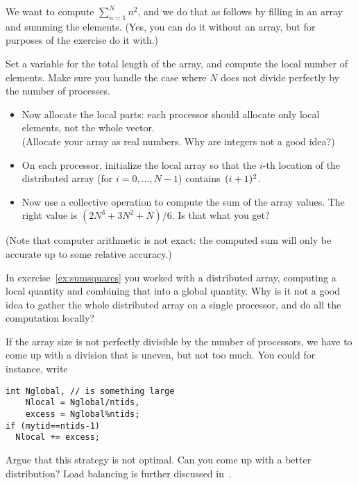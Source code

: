 \begin{exercise}
  \label{ex:sumsquares}
  We want to compute $\sum_{n=1}^Nn^2$, and we do that as follows
  by filling in an array and summing the elements. (Yes, you can do it
  without an array, but for purposes of the exercise do it with.)

  Set a variable  for the total length of the array, and compute
  the local number of elements. Make sure you handle the case where
  $N$ does not divide perfectly by the number of processes.

  \begin{itemize}
  \item Now allocate the local parts: each processor should allocate
    only local elements, not the whole vector.\\
    (Allocate your array as real numbers. Why are integers not a good idea?)
  \item On each processor, initialize the local array
    so that the $i$-th location of the distributed array
    (for $i=0,\ldots,N-1$)
    contains~$(i+\nobreak 1)^2$.
  \item Now use a collective operation to compute the sum of the array values.
    The right value is $(2N^3+3N^2+N)/6$. Is that what you get?
  \end{itemize}
  (Note that computer arithmetic is not exact: the computed sum will
  only be accurate up to some relative accuracy.)
\end{exercise}

\begin{exercise}
  In exercise~\ref{ex:sumsquares} you worked with a distributed array,
  computing a local quantity and combining that into a global
  quantity.
  Why is it not a good idea to gather the whole distributed array on a
  single processor, and do all the computation locally?
\end{exercise}

If the array size is not perfectly divisible by the number of processors,
we have to come up with a division that is uneven, but not too much.
You could for instance, write
\begin{verbatim}
int Nglobal, // is something large
    Nlocal = Nglobal/ntids,
    excess = Nglobal%ntids;
if (mytid==ntids-1) 
  Nlocal += excess;
\end{verbatim}

\begin{exercise}
  Argue that this strategy is not optimal. Can you come up with a
  better distribution?
  Load balancing is further discussed in~.
\end{exercise}

